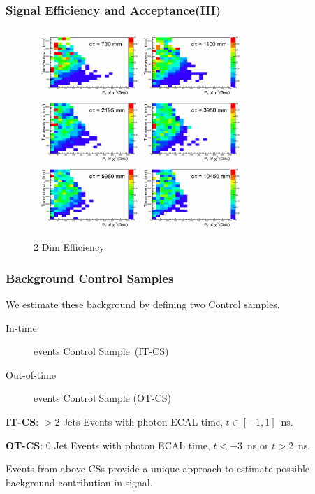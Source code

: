 \documentclass{beamer}
\begin{document}
\begin{frame}
\frametitle{Signal Efficiency and Acceptance(III)}
  \begin{figure}[ht]
   \begin{minipage}[b]{0.7\linewidth}
    \mbox{
  \centering
  \includegraphics[height=7.5cm, width=0.65\paperwidth]{THESISPLOTS/Eff180_xPt_ct.png} }
    \vspace{-0.5cm}
    \caption{2 Dim Efficiency}
  \end{minipage}
 \end{figure}
\end{frame}

\begin{frame}
\frametitle{Background Control Samples}
We estimate these background by defining two Control samples.
\begin{flushleft}
 \begin{description}
   \item[In-time] events Control Sample~(IT-CS)
   \item[Out-of-time] events Control Sample (OT-CS)
 \end{description} 
 \end{flushleft}
\begin{tcolorbox}[colback=UNL@Cream!5,colframe=UMN@Maroon!40,title=\textcolor{UMN@Gold}{\textbf{Control Sample (In-time Events)}}]
\textbf{IT-CS}: $> 2$ Jets Events with photon ECAL time, $t \in [-1, 1]$~ns.
\end{tcolorbox}

\begin{tcolorbox}[colback=UNL@Cream!5,colframe=UMN@Maroon!40,title=\textcolor{UMN@Gold}{\textbf{Control Sample (Out-Of-time Events)}}]
\textbf{OT-CS}: $0$ Jet Events with photon ECAL time, $ t < -3$~ns or $t > 2$~ns.
\end{tcolorbox}
 
 \begin{minipage}[t]{0.8\linewidth}
 Events from above CSs provide a unique approach to estimate possible background contribution in signal.
 \end{minipage}
\end{frame}
\end{document}
